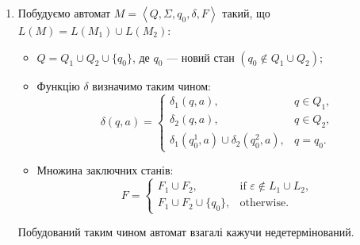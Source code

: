 \begin{enumerate}
	\item Побудуємо автомат $M = \left\langle Q, \Sigma, q_0, \delta, F \right\rangle$ такий, що $L(M) = L(M_1) \cup L(M_2)$:
	\begin{itemize}
		\item $Q = Q_1 \cup Q_2 \cup \{q_0\}$, де $q_0$ --- новий стан $(q_0 \notin Q_1 \cup Q_2)$;
		\item Функцію $\delta$ визначимо таким чином:
		\[
		\delta(q, a) = \begin{cases}
			\delta_1(q, a), & q \in Q_1, \\
			\delta_2(q, a), & q \in Q_2, \\
			\delta_1(q_0^1, a) \cup \delta_2(q_0^2, a), & q = q_0. 
		\end{cases}
		\]
		\item Множина заключних станів:
		\[
		F = \begin{cases}
		F_1 \cup F_2, & \text{if } \varepsilon \notin L_1 \cup L_2, \\
		F_1 \cup F_2 \cup \{q_0\}, & \text{otherwise}.
		\end{cases}
		\]	
	\end{itemize}
	
	Побудований таким чином автомат взагалі кажучи недетермінований. \medskip


\end{enumerate}
